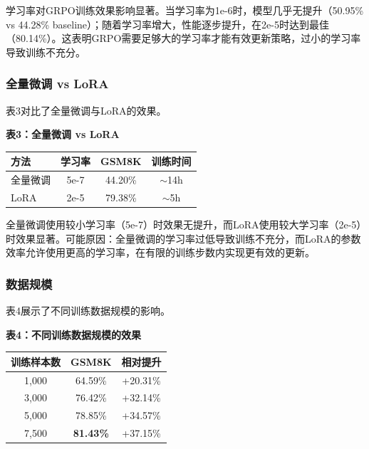 \documentclass[10.5pt]{article}
\begin{document}
学习率对GRPO训练效果影响显著。当学习率为1e-6时，模型几乎无提升（50.95\% vs 44.28\% baseline）；随着学习率增大，性能逐步提升，在2e-5时达到最佳（80.14\%）。这表明GRPO需要足够大的学习率才能有效更新策略，过小的学习率导致训练不充分。

\subsubsection{全量微调 vs LoRA}

表3对比了全量微调与LoRA的效果。

\begin{center}
\textbf{表3：全量微调 vs LoRA}
\end{center}

\begin{center}
\begin{tabular}{lccc}
\hline
\textbf{方法} & \textbf{学习率} & \textbf{GSM8K} & \textbf{训练时间} \\
\hline
全量微调 & 5e-7 & 44.20\% & $\sim$14h \\
LoRA & 2e-5 & 79.38\% & $\sim$5h \\
\hline
\end{tabular}
\end{center}

全量微调使用较小学习率（5e-7）时效果无提升，而LoRA使用较大学习率（2e-5）时效果显著。可能原因：全量微调的学习率过低导致训练不充分，而LoRA的参数效率允许使用更高的学习率，在有限的训练步数内实现更有效的更新。

\subsubsection{数据规模}

表4展示了不同训练数据规模的影响。

\begin{center}
\textbf{表4：不同训练数据规模的效果}
\end{center}

\begin{center}
\begin{tabular}{ccc}
\hline
\textbf{训练样本数} & \textbf{GSM8K} & \textbf{相对提升} \\
\hline
1,000 & 64.59\% & +20.31\% \\
3,000 & 76.42\% & +32.14\% \\
5,000 & 78.85\% & +34.57\% \\
7,500 & \textbf{81.43\%} & +37.15\% \\
\hline
\end{tabular}
\end{center}
\end{document}
